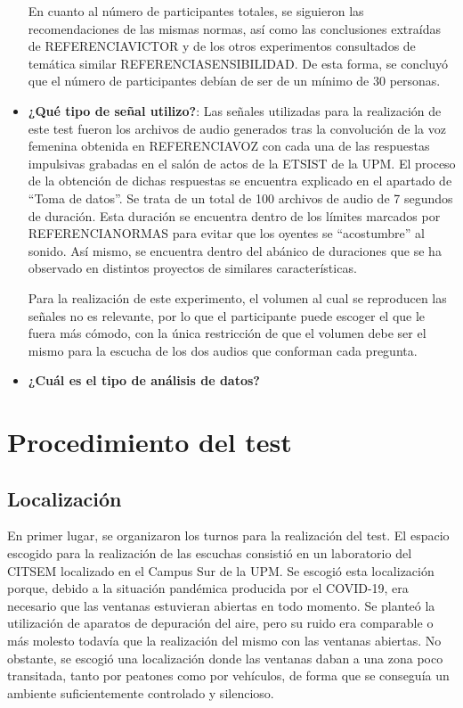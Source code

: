 \documentclass[11pt,a4paper,twoside]{book}
\begin{document}
\begin{itemize}
                En cuanto al número de participantes totales, se siguieron las recomendaciones de las mismas normas, así como las conclusiones extraídas de REFERENCIAVICTOR y de los otros experimentos consultados de temática similar REFERENCIASENSIBILIDAD. De esta forma, se concluyó que el número de participantes debían de ser de un mínimo de 30 personas.
                \item \textbf{¿Qué tipo de señal utilizo?}: Las señales utilizadas para la realización de este test fueron los archivos de audio generados tras la convolución de la voz femenina obtenida en REFERENCIAVOZ con cada una de las respuestas impulsivas grabadas en el salón de actos de la ETSIST de la UPM. El proceso de la obtención de dichas respuestas se encuentra explicado en el apartado de ``Toma de datos''. Se trata de un total de 100 archivos de audio de 7 segundos de duración. Esta duración se encuentra dentro de los límites marcados por REFERENCIANORMAS para evitar que los oyentes se ``acostumbre'' al  sonido. Así mismo, se encuentra dentro del abánico de duraciones que se ha observado en distintos proyectos de similares características.
                
                Para la realización de este experimento, el volumen al cual se reproducen las señales no es relevante, por lo que el participante puede escoger el que le fuera más cómodo, con la única restricción de que el volumen debe ser el mismo para la escucha de los dos audios que conforman cada pregunta.
                \item \textbf{¿Cuál es el tipo de análisis de datos?}
            \end{itemize}
        \section{Procedimiento del test}
        
            \subsection*{Localización}
                En primer lugar, se organizaron los turnos para la realización del test. El espacio escogido para la realización de las escuchas consistió en un laboratorio del CITSEM localizado en el Campus Sur de la UPM. Se escogió esta localización porque, debido a la situación pandémica producida por el COVID-19, era necesario que las ventanas estuvieran abiertas en todo momento. Se planteó la utilización de aparatos de depuración del aire, pero su ruido era comparable o más molesto todavía que la realización del mismo con las ventanas abiertas. No obstante, se escogió una localización donde las ventanas daban a una zona poco transitada, tanto por peatones como por vehículos, de forma que se conseguía un ambiente suficientemente controlado y silencioso.
            
\end{document}

